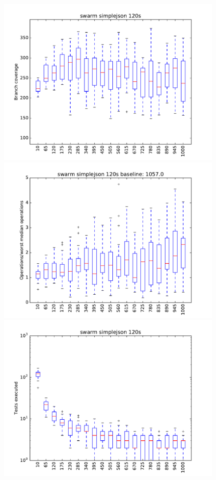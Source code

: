 \begin{figure}
\includegraphics[width=\columnwidth]{graphs/simplejsonswarm120}
\includegraphics[width=\columnwidth]{graphs/opssimplejsonswarm120}
\includegraphics[width=\columnwidth]{graphs/execsimplejsonswarm120}
\end{figure}

